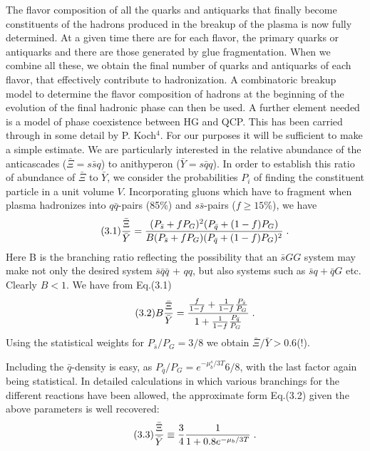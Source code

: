\begin{mdframed}[linecolor=gray,roundcorner=12pt,backgroundcolor=Dandelion!15,linewidth=1pt,leftmargin=0cm,rightmargin=0cm,topline=true,bottomline=true,skipabove=12pt]
The flavor composition of all the quarks and antiquarks that finally become constituents of the hadrons produced in the breakup of the plasma is now fully determined. At a given time there are for each flavor, the primary quarks or antiquarks and there are those generated by glue fragmentation. When we combine all these, we obtain the final number of quarks and antiquarks of each flavor, that effectively contribute to hadronization. A combinatoric breakup model to determine the flavor composition of hadrons at the beginning of the evolution of the final hadronic phase can then be used. A further element needed is a model of phase coexistence between HG and QCP. This has been carried through in some detail by P. Koch$^4$. For our purposes it will be sufficient to make a simple estimate. We are particularly interested in the relative abundance of the anticascades ($\bar{\Xi}=\bar{ssq}$) to anithyperon ($\bar Y = \bar{sqq}$). In order to establish this ratio of abundance of $\bar \Xi$ to $\bar Y$, we consider the probabilities $P_i$ of finding the constituent particle in a unit volume $V$. Incorporating gluons which have to fragment when plasma hadronizes into 
$q \bar q$-pairs (85\%) and $s \bar s$-pairs ($f \geq 15$\%), we have
\begin{equation}\tag{3.1}
{{\bar \Xi} \over {\bar Y}}=
{
{(P_{\bar s} + f P_G)^2 (P_{\bar q} +(1-f)P_G)}
\over
{B(P_{\bar s} +f P_G) (P_{\bar q} + (1-f)P_G)^2}
}\;.
\end{equation}
Here B is the branching ratio reflecting the possibility that an $\bar s GG$ system may make not only the desired system $\bar s\bar q\bar q $ + $qq$, but also systems such as $\bar s q + \bar q G$ etc. Clearly  $B<1$. We have from Eq.(3.1)
\begin{equation}\tag{3.2}
B{ {\bar \Xi} \over {\bar Y}}=\displaystyle\frac
{{f \over {1-f}}+ { 1 \over{1-f}} \frac{P_{\bar s}}{P_G}}
{1+{1\over{1-f}}\frac{P_{\bar q}}{P_G}}\;.
\end{equation}
Using the statistical weights for $P_{\bar s}/P_G=3/8$ we obtain 
$\bar \Xi/\bar Y >0.6$(!). 

Including the $\bar q$-density is easy, as 
$P_{\bar q}/P_G=e^{-\mu^s_b/3T} 6/8$, 
 with the last factor again being statistical. In detailed calculations in which various branchings for the different reactions have been allowed\footnotemark[5], the approximate form Eq.(3.2) given the above parameters is well recovered:
\begin{equation}\tag{3.3}
{{\bar \Xi} \over {\bar Y}} \equiv \frac 3 4
{ 1 \over
{1+0.8e^{-\mu_b /3T}}
}\;.
\end{equation} 


\end{mdframed}
